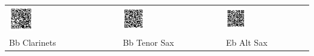 \begin{tabular}{p{} p{} p{}  p{} p{}}
  \includegraphics[width=0.25\textwidth]{QR_Codes/QR_NothingElseMatters_Bb_Clar.png}
  &
  &
  \includegraphics[width=0.25\textwidth]{QR_Codes/QR_NothingElseMatters_Bb_TenSax.png}
  &
  &
  \includegraphics[width=0.25\textwidth]{QR_Codes/QR_NothingElseMatters_Eb.png}\\                                                     
   Bb Clarinets 
   &
   &
   Bb Tenor Sax
   &
   &
   Eb Alt Sax\\
\end{tabular}